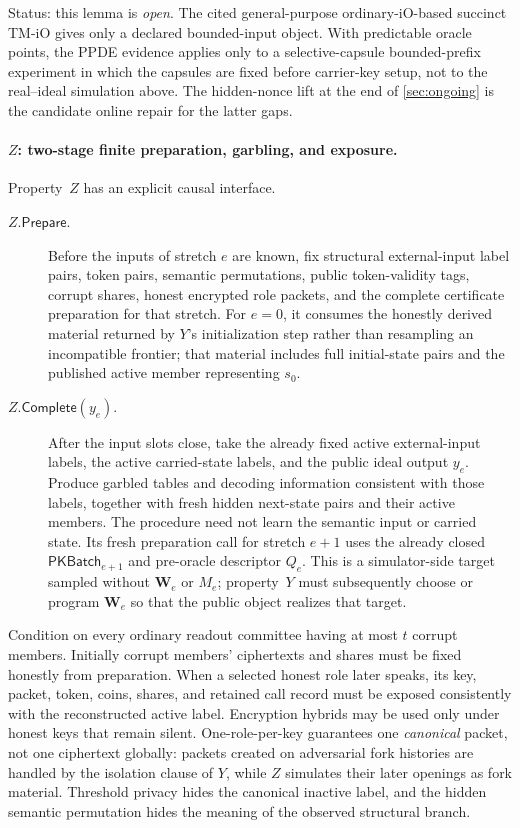 Status: this lemma is \emph{open}.  The cited general-purpose
ordinary-iO-based succinct TM-iO gives only a declared bounded-input object.
With predictable oracle points, the PPDE evidence applies only to a
selective-capsule bounded-prefix experiment in which the capsules are fixed
before carrier-key setup, not to the real--ideal simulation above.  The
hidden-nonce lift at the end of \cref{sec:ongoing} is the candidate online
repair for the latter gaps.

\paragraph{$Z$: two-stage finite preparation, garbling, and exposure.}
Property~$Z$ has an explicit causal interface.
\begin{description}
  \item[$Z.\mathsf{Prepare}$.]
    Before the inputs of stretch $e$ are known, fix structural external-input
    label pairs, token pairs, semantic permutations, public token-validity
    tags, corrupt shares, honest encrypted role packets, and the complete
    certificate preparation for that stretch.  For $e=0$, it consumes the
    honestly derived material returned by $Y$'s initialization step rather
    than resampling an incompatible frontier; that material includes full
    initial-state pairs and the published active member representing $s_0$.
  \item[$Z.\mathsf{Complete}(y_e)$.]
    After the input slots close, take the already fixed active external-input
    labels, the active carried-state labels, and the public ideal output
    $y_e$.  Produce garbled tables and decoding information consistent with
    those labels, together with fresh hidden next-state pairs and their active
    members.  The procedure need not learn the semantic input or carried
    state.  Its fresh preparation call for stretch $e+1$ uses the already
    closed $\mathsf{PKBatch}_{e+1}$ and pre-oracle descriptor $Q_e$.  This is
    a simulator-side target sampled without $\mathbf W_e$ or $M_e$;
    property~$Y$ must subsequently choose or program $\mathbf W_e$ so that the
    public object realizes that target.
\end{description}

Condition on every ordinary readout committee having at most $t$ corrupt
members.  Initially corrupt members' ciphertexts and shares must be fixed
honestly from preparation.  When a selected honest role later speaks, its
key, packet, token, coins, shares, and retained call record must be exposed
consistently with the reconstructed active label.  Encryption hybrids may be
used only under honest keys that remain silent.  One-role-per-key guarantees
one \emph{canonical} packet, not one ciphertext globally: packets created on
adversarial fork histories are handled by the isolation clause of $Y$, while
$Z$ simulates their later openings as fork material.  Threshold privacy hides
the canonical inactive label, and the hidden semantic permutation hides the
meaning of the observed structural branch.

